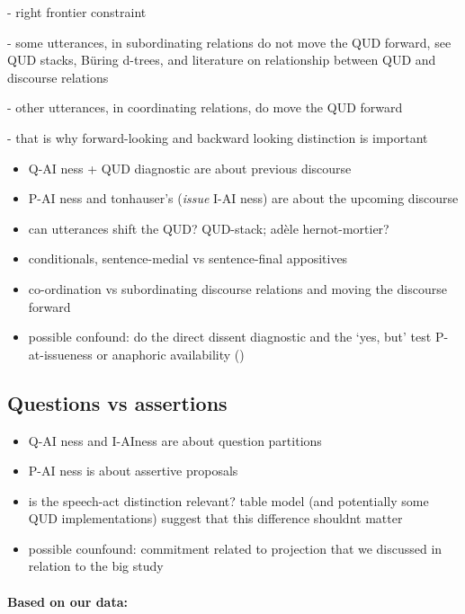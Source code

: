\documentclass[12pt]{article}
\begin{document}
    - right frontier constraint

    - some utterances, in subordinating relations do not move the QUD forward, see QUD stacks, Büring d-trees, and literature on relationship between QUD and discourse relations

    - other utterances, in coordinating relations, do move the QUD forward

    - that is why forward-looking and backward looking distinction is important 

    \begin{itemize}
      \item Q-AI ness + QUD diagnostic are about previous discourse
      \item P-AI ness and tonhauser's (\emph{issue} I-AI ness) are about the upcoming discourse
      \item can utterances shift the QUD? QUD-stack; adèle hernot-mortier?
      \item conditionals, sentence-medial vs sentence-final appositives
      \item co-ordination vs subordinating discourse relations and moving the discourse forward 
      \item possible confound: do the direct dissent diagnostic and the `yes, but' test P-at-issueness or anaphoric availability (\cite{snider_distinguishing_2018})
    \end{itemize}  
  

  \subsection{Questions vs assertions} %
      \begin{itemize}
        \item Q-AI ness and I-AIness are about question partitions
        \item P-AI ness is about assertive proposals
        \item is the speech-act distinction relevant? table model (and potentially some QUD implementations) suggest that this difference shouldnt matter
        \item possible counfound: commitment related to projection that we discussed in relation to the big study
      \end{itemize}
      
      \paragraph{Based on our data:} %
      
\end{document}
